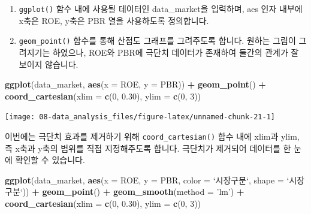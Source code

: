 \documentclass[12pt,]{book}
\newenvironment{Shaded}{\begin{snugshade}}{\end{snugshade}}
\newcommand{\DataTypeTok}[1]{\textcolor[rgb]{0.13,0.29,0.53}{#1}}
\newcommand{\DecValTok}[1]{\textcolor[rgb]{0.00,0.00,0.81}{#1}}
\newcommand{\FloatTok}[1]{\textcolor[rgb]{0.00,0.00,0.81}{#1}}
\newcommand{\KeywordTok}[1]{\textcolor[rgb]{0.13,0.29,0.53}{\textbf{#1}}}
\newcommand{\NormalTok}[1]{#1}
\newcommand{\OperatorTok}[1]{\textcolor[rgb]{0.81,0.36,0.00}{\textbf{#1}}}
\newcommand{\StringTok}[1]{\textcolor[rgb]{0.31,0.60,0.02}{#1}}
\providecommand{\tightlist}{%
  \setlength{\itemsep}{0pt}\setlength{\parskip}{0pt}}
\begin{document}
\begin{enumerate}
\def\labelenumi{\arabic{enumi}.}
\tightlist
\item
  \texttt{ggplot()} 함수 내에 사용될 데이터인 data\_market을 입력하며, aes 인자 내부에 x축은 ROE, y축은 PBR 열을 사용하도록 정의합니다.
\item
  \texttt{geom\_point()} 함수를 통해 산점도 그래프를 그려주도록 합니다. 원하는 그림이 그려지기는 하였으나, ROE와 PBR에 극단치 데이터가 존재하여 둘간의 관계가 잘 보이지 않습니다.
\end{enumerate}

\begin{Shaded}
\begin{Highlighting}[]
\KeywordTok{ggplot}\NormalTok{(data_market, }\KeywordTok{aes}\NormalTok{(}\DataTypeTok{x =}\NormalTok{ ROE, }\DataTypeTok{y =}\NormalTok{ PBR)) }\OperatorTok{+}
\StringTok{  }\KeywordTok{geom_point}\NormalTok{() }\OperatorTok{+}
\StringTok{  }\KeywordTok{coord_cartesian}\NormalTok{(}\DataTypeTok{xlim =} \KeywordTok{c}\NormalTok{(}\DecValTok{0}\NormalTok{, }\FloatTok{0.30}\NormalTok{), }\DataTypeTok{ylim =} \KeywordTok{c}\NormalTok{(}\DecValTok{0}\NormalTok{, }\DecValTok{3}\NormalTok{))}
\end{Highlighting}
\end{Shaded}

\begin{center}\texttt{[image: 08-data\_analysis\_files/figure-latex/unnamed-chunk-21-1]} \end{center}

이번에는 극단치 효과를 제거하기 위해 \texttt{coord\_cartesian()} 함수 내에 xlim과 ylim, 즉 x축과 y축의 범위를 직접 지정해주도록 합니다. 극단치가 제거되어 데이터를 한 눈에 확인할 수 있습니다.

\begin{Shaded}
\begin{Highlighting}[]
\KeywordTok{ggplot}\NormalTok{(data_market, }\KeywordTok{aes}\NormalTok{(}\DataTypeTok{x =}\NormalTok{ ROE, }\DataTypeTok{y =}\NormalTok{ PBR,}
                        \DataTypeTok{color =} \StringTok{`}\DataTypeTok{시장구분}\StringTok{`}\NormalTok{,}
                        \DataTypeTok{shape =} \StringTok{`}\DataTypeTok{시장구분}\StringTok{`}\NormalTok{)) }\OperatorTok{+}
\StringTok{  }\KeywordTok{geom_point}\NormalTok{() }\OperatorTok{+}
\StringTok{  }\KeywordTok{geom_smooth}\NormalTok{(}\DataTypeTok{method =} \StringTok{'lm'}\NormalTok{) }\OperatorTok{+}
\StringTok{  }\KeywordTok{coord_cartesian}\NormalTok{(}\DataTypeTok{xlim =} \KeywordTok{c}\NormalTok{(}\DecValTok{0}\NormalTok{, }\FloatTok{0.30}\NormalTok{), }\DataTypeTok{ylim =} \KeywordTok{c}\NormalTok{(}\DecValTok{0}\NormalTok{, }\DecValTok{3}\NormalTok{))}
\end{Highlighting}
\end{Shaded}
\end{document}
